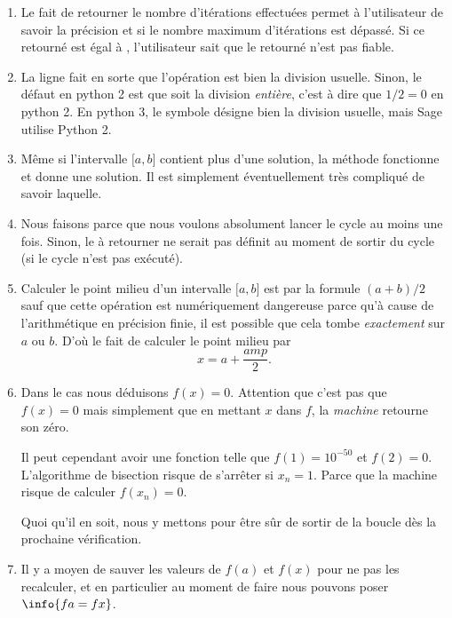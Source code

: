 \begin{enumerate}
    \item
Le fait de retourner le nombre d'itérations effectuées permet à l'utilisateur de savoir la précision et si le nombre maximum d'itérations est dépassé. Si ce  retourné est égal à , l'utilisateur sait que le  retourné n'est pas fiable.
\item
    La ligne  fait en sorte que l'opération \info{/} est bien la division usuelle. Sinon, le défaut en python 2 est que \info{/} soit la division \emph{entière}, c'est à dire que \( 1/2=0\) en python 2.
    En python 3, le symbole \info{/} désigne bien la division usuelle, mais Sage utilise Python 2.
\item
    Même si l'intervalle \( \mathopen[ a , b \mathclose]\) contient plus d'une solution, la méthode fonctionne et donne une solution. Il est simplement éventuellement très compliqué de savoir laquelle.
\item
    Nous faisons  parce que nous voulons absolument lancer le cycle au moins une fois. Sinon, le  à retourner ne serait pas définit au moment de sortir du cycle (si le cycle n'est pas exécuté).
\item
    Calculer le point milieu d'un intervalle \( \mathopen[ a , b \mathclose]\) est par la formule \( (a+b)/2\) sauf que cette opération est numériquement dangereuse parce qu'à cause de l'arithmétique en précision finie, il est possible que cela tombe \emph{exactement} sur \( a\) ou \( b\). D'où le fait de calculer le point milieu par
    \begin{equation}
        x=a+\frac{ amp }{2}.
    \end{equation}
\item
    Dans le cas  nous déduisons \( f(x)=0\). Attention que c'est pas que \( f(x)=0\) mais simplement que en mettant \( x\) dans \( f\), la \emph{machine} retourne son zéro.

    Il peut cependant avoir une fonction telle que \( f(1)=10^{-50}\) et \( f(2)=0\). L'algorithme de bisection risque de s'arrêter si \( x_n=1\). Parce que la machine risque de calculer \( f(x_n)=0\).

    Quoi qu'il en soit, nous y mettons  pour être sûr de sortir de la boucle dès la prochaine vérification.
\item
    Il y a moyen de sauver les valeurs de \( f(a)\) et \( f(x)\) pour ne pas les recalculer, et en particulier au moment de faire  nous pouvons poser \(\info{fa=fx}\).
\end{enumerate}

